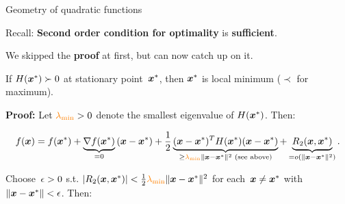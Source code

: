 \documentclass[11pt,compress,t,notes=noshow, xcolor=table]{beamer}
\begin{document}
\begin{vbframe}{Geometry of quadratic functions}
\begin{itemize}
        




\end{itemize}

Recall: \textbf{Second order condition for optimality} is \textbf{sufficient}.

\medskip

We skipped the \textbf{proof} at first, but can now catch up on it.


    \footnotesize
     If $H(\bm{x}^\ast) \succ 0$ at stationary point~$\bm{x}^\ast$, then $\bm{x}^\ast$ is local minimum ($\prec$ for maximum).

     \medskip

    \textbf{Proof:}
    Let $\textcolor{orange}{\lambda_\text{min}}>0$ denote the smallest eigenvalue of $H(\bm{x}^\ast)$.
    Then:
    
    
    \begin{equation*}
        f(\bm{x}) = f(\bm{x}^\ast) + \underbrace{\nabla f(\bm{x}^\ast)}_{=0}{}(\bm{x}-\bm{x}^\ast) + \frac{1}{2}\underbrace{(\bm{x}-\bm{x}^\ast)^T H(\bm{x}^\ast)(\bm{x}-\bm{x}^\ast)}_{\geq \textcolor{orange}{\lambda_\text{min}} \|\bm{x}-\bm{x}^\ast\|^2 \text{ (see above)}} + \underbrace{R_2(\bm{x},\bm{x}^\ast)}_{=o(\|\bm{x}-\bm{x}^\ast\|^2)}.
    \end{equation*}

    Choose~$\epsilon>0$ s.t. $|R_2(\bm{x},\bm{x}^\ast)| < \frac{1}{2} \textcolor{orange}{\lambda_\text{min}} \|\bm{x}-\bm{x}^\ast\|^2$ for each~$\bm{x} \neq \bm{x}^\ast$ with $\|\bm{x}-\bm{x}^\ast\|<\epsilon$.
    Then:


\end{vbframe}
\end{document}

